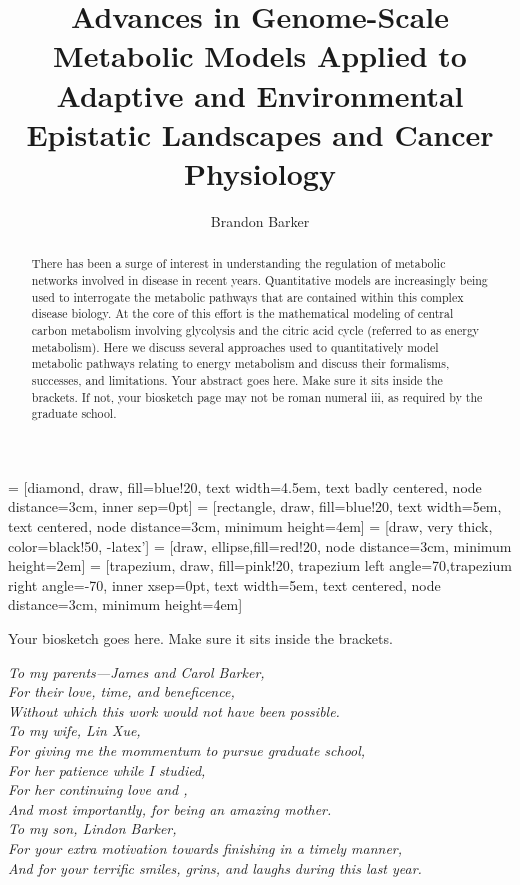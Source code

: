 \documentclass[phd,tocprelim]{cornell}
\title {Advances in Genome-Scale Metabolic Models Applied to Adaptive and Environmental Epistatic Landscapes and Cancer Physiology}
\author {Brandon Barker}
\begin{document}
 = [diamond, draw, fill=blue!20,
    text width=4.5em, text badly centered, node distance=3cm, inner sep=0pt]
 = [rectangle, draw, fill=blue!20,
    text width=5em, text centered, node distance=3cm, minimum height=4em]
 = [draw, very thick, color=black!50, -latex']
 = [draw, ellipse,fill=red!20, node distance=3cm,
    minimum height=2em]
 = [trapezium, draw, fill=pink!20,
    trapezium left angle=70,trapezium right angle=-70, inner xsep=0pt,
    text width=5em, text centered, node distance=3cm, minimum height=4em]


\maketitle
\makecopyright

\begin{abstract}

There has been a surge of interest in understanding the regulation 
of metabolic networks involved in disease in recent years.  Quantitative 
models are increasingly being used to interrogate the metabolic pathways 
that are contained within this complex disease biology.  At the core of 
this effort is the mathematical modeling of central carbon metabolism involving 
glycolysis and the citric acid cycle (referred to as energy metabolism).  
Here we discuss several approaches used to quantitatively model metabolic 
pathways relating to energy metabolism and discuss their formalisms, successes, and limitations.
Your abstract goes here. Make sure it sits inside the brackets. If not,
your biosketch page may not be roman numeral iii, as required by the
graduate school.
\end{abstract}

\begin{biosketch}
Your biosketch goes here. Make sure it sits inside
the brackets.
\end{biosketch}

\begin{dedication}
\begin{center}
\textit{To my parents---James and Carol Barker, \\
For their love, time, and beneficence, \\
Without which this work would not have been possible. \\
\vspace{10 mm} 
To my wife, Lin Xue, \\
For giving me the mommentum to pursue graduate school, \\
For her patience while I studied, \\
For her continuing love and , \\
And most importantly, for being an amazing mother.\\
\vspace{10 mm} 
To my son, Lindon Barker, \\
For your extra motivation towards finishing in a timely manner, \\
And for your terrific smiles, grins, and laughs during this last year.}
\end{center}
\end{dedication}
\end{document}
